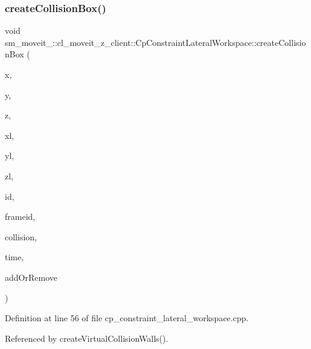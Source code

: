 \subsubsection{\texorpdfstring{create\+Collision\+Box()}{createCollisionBox()}}
{\footnotesize\ttfamily void sm\+\_\+moveit\+\_\+::cl\+\_\+moveit\+\_\+z\+\_\+client\+::\+Cp\+Constraint\+Lateral\+Workspace\+::create\+Collision\+Box (\begin{DoxyParamCaption}\item[{float}]{x,  }\item[{float}]{y,  }\item[{float}]{z,  }\item[{float}]{xl,  }\item[{float}]{yl,  }\item[{float}]{zl,  }\item[{std\+::string}]{id,  }\item[{std\+::string}]{frameid,  }\item[{moveit\+\_\+msgs\+::\+Collision\+Object \&}]{collision,  }\item[{const ros\+::\+Time \&}]{time,  }\item[{int}]{add\+Or\+Remove }\end{DoxyParamCaption})}



Definition at line 56 of file cp\+\_\+constraint\+\_\+lateral\+\_\+workspace.\+cpp.



Referenced by create\+Virtual\+Collision\+Walls().


